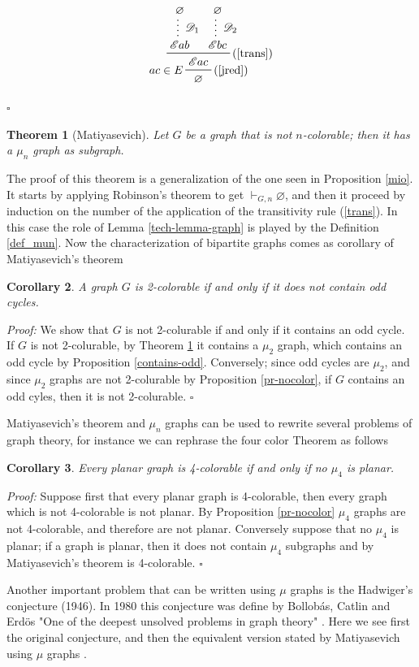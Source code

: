 \documentclass[a4paper,12pt,oneside]{book}
\newtheorem{theorem}{Theorem}[chapter]
\newtheorem{corollary}[theorem]{Corollary}
\newcommand{\E}{\mathscr{E}}
\newcommand{\D}{\mathscr{D}}
\newcommand*{\QED}{\hfill\ensuremath{\square}}
\let\emptyset\varnothing
\begin{document}
\begin{equation*}
\prftree[l,r]{(\ref{jred})} {$ac\in E$}
{  \prftree[r]{(\ref{trans})}  
{  \prfsummary[$\D_1$]{\emptyset}{\E ab } }{ \prfsummary[$\D_2$]{\emptyset}{\E bc  }} 
 {\E ac } } 
{\emptyset}
\end{equation*}

\QED


\begin{theorem}[Matiyasevich]\label{mati-thm}
Let $G$ be a graph that is not $n$-colorable; then it has a $\mu_n$ graph as subgraph.
\end{theorem}
The proof of this theorem is a generalization of the one seen in Proposition \ref{mio}. It starts by applying Robinson's theorem to get $\vdash_{G,n}\emptyset$, and then it proceed by induction on the number of the application of the transitivity rule (\ref{trans}). In this case the role of Lemma \ref{tech-lemma-graph} is played by the Definition \ref{def_mun}. Now the characterization of bipartite graphs comes as corollary of Matiyasevich's theorem

\begin{corollary}
A graph $G$ is 2-colorable if and only if it does not contain odd cycles.
\end{corollary}
\textit{Proof:}
We show that $G$ is not 2-colurable if and only if it contains an odd cycle.
If $G$ is not 2-colurable, by Theorem \ref{mati-thm} it contains a $\mu_2$ graph, which contains an odd cycle by Proposition \ref{contains-odd}. Conversely; since odd cycles are $\mu_2$, and since $\mu_2$ graphs are not 2-colurable by Proposition \ref{pr-nocolor}, if $G$  contains an odd cyles, then it is not 2-colurable. \QED

Matiyasevich's theorem and $\mu_n$ graphs can be used to rewrite several problems of graph theory, for instance we can rephrase the four color Theorem as follows

\begin{corollary}\label{cor-4}
Every planar graph is 4-colorable if and only if no $\mu_4$ is planar.
\end{corollary}
\textit{Proof:}
Suppose first that every planar graph is 4-colorable, then every graph which is not 4-colorable is not planar. By Proposition \ref{pr-nocolor} $\mu_4$ graphs are not 4-colorable, and therefore are not planar.
Conversely suppose that no $\mu_4$ is planar; if a graph is planar, then it does not contain $\mu_4$ subgraphs and by Matiyasevich's theorem is 4-colorable.
\QED

\newpage
Another important problem that can be written using $\mu$ graphs is the Hadwiger's conjecture (1946)\cite{hadwiger}. In 1980 this conjecture was define by Bollobás, Catlin and  Erd\"os  "One of the deepest unsolved problems in graph theory" \cite{erdos}. Here we see first the original conjecture, and then the equivalent version stated by Matiyasevich using $\mu$ graphs \cite{mat-2}.
\end{document}
